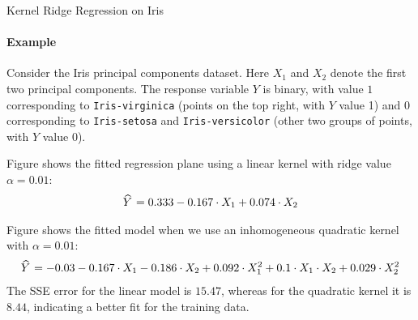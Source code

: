 \begin{frame}{Kernel Ridge Regression on Iris}
\framesubtitle{Example}
    Consider the Iris principal components dataset. %
Here $X_1$ and $X_2$ denote the
    first two principal components. The response variable $Y$ is binary,
    with value $1$ corresponding to {\tt Iris-virginica} (points on the
    top right, with $Y$ value 1) and $0$
    corresponding to {\tt Iris-setosa} and {\tt Iris-versicolor} (other
    two groups of points, with $Y$ value $0$).


\medskip

Figure shows the fitted regression
    plane using a linear kernel with ridge value $\alpha=0.01$:
    \begin{align*}
        \mkern 1.5mu\widehat{\mkern-1.5muY}\mkern 1.5mu = 0.333 - 0.167 \cdot X_1 + 0.074 \cdot X_2
    \end{align*}

Figure shows the fitted model
    when we use an inhomogeneous quadratic kernel with $\alpha=0.01$:
    \begin{align*}
        \mkern 1.5mu\widehat{\mkern-1.5muY}\mkern 1.5mu = -0.03 - 0.167 \cdot X_1 - 0.186 \cdot X_2 
        + 0.092 \cdot X_1^2 + 0.1 \cdot X_1 \cdot X_2 + 0.029 \cdot X_2^2
    \end{align*}
    The SSE error for the linear model is $15.47$, whereas for the
    quadratic kernel it is $8.44$, indicating a 
    better fit for the training data.
\end{frame}
%
%
%
